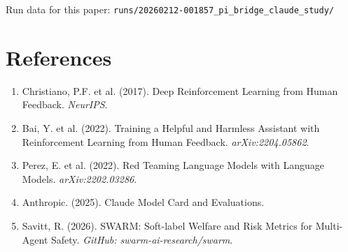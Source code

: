 \documentclass[11pt]{article}
\begin{document}
Run data for this paper: \texttt{runs/20260212-001857\_pi\_bridge\_claude\_study/}

\section{References}

\begin{enumerate}
  \item Christiano, P.F. et al. (2017). Deep Reinforcement Learning from Human Feedback. \textit{NeurIPS}.
  \item Bai, Y. et al. (2022). Training a Helpful and Harmless Assistant with Reinforcement Learning from Human Feedback. \textit{arXiv:2204.05862}.
  \item Perez, E. et al. (2022). Red Teaming Language Models with Language Models. \textit{arXiv:2202.03286}.
  \item Anthropic. (2025). Claude Model Card and Evaluations.
  \item Savitt, R. (2026). SWARM: Soft-label Welfare and Risk Metrics for Multi-Agent Safety. \textit{GitHub: swarm-ai-research/swarm}.
\end{enumerate}
\end{document}
